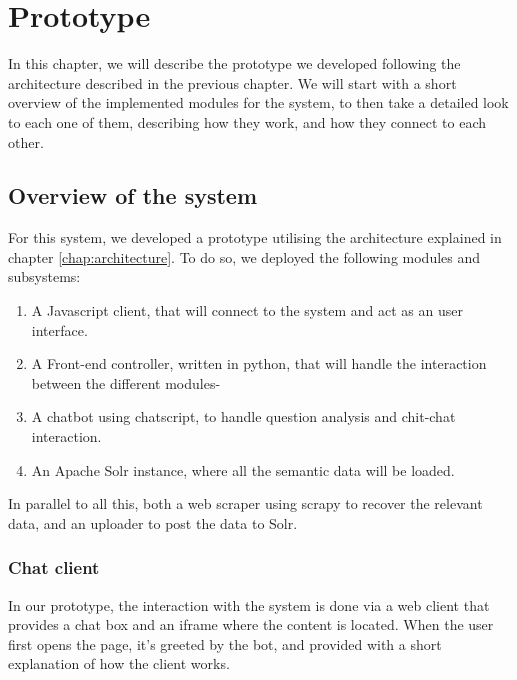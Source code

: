 \chapter{Prototype}
\label{chap:prototype}

\begin{chapterintro}

In this chapter, we will describe the prototype we developed following the architecture described in the previous chapter. We will start with a short overview of the implemented modules for the system, to then take a detailed look to each one of them, describing how they work, and how they connect to each other.
 
\end{chapterintro}

\cleardoublepage

\section{Overview of the system}

For this system, we developed a prototype utilising the architecture explained in chapter \ref{chap:architecture}. To do so, we deployed the following modules and subsystems:

\begin{enumerate}
 \item A Javascript client, that will connect to the system and act as an user interface.
 \item A Front-end controller, written in python, that will handle the interaction between the different modules-
 \item A chatbot using chatscript, to handle question analysis and chit-chat interaction.
 \item An Apache Solr instance, where all the semantic data will be loaded.
\end{enumerate}

In parallel to all this, both a web scraper using scrapy to recover the relevant data, and an uploader to post the data to Solr.

\subsection{Chat client}
\label{sec:chatclient}

In our prototype, the interaction with the system is done via a web client that provides a chat box and an iframe where the content is located. When the user first opens the page, it's greeted by the bot, and provided with a   short explanation of how the client works.


